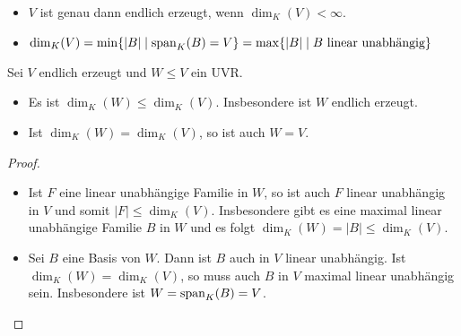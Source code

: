 \begin{remark}
	\begin{itemize}
		\item $V$ ist genau dann endlich erzeugt, wenn $\dim_K(V)< \infty$.
		\item $\dim_K(V)=\min\{|B| \mid \operatorname{span}_K(B)=V\}=\max\{|B| \mid B\text{ linear unabhängig}\}$
	\end{itemize}
\end{remark}

\begin{proposition}
	Sei $V$ endlich erzeugt und $W\le V$ ein UVR.
	\begin{itemize}
		\item Es ist $\dim_K(W)\le \dim_K(V)$. Insbesondere ist $W$ endlich erzeugt.
		\item Ist $\dim_K(W)=\dim_K(V)$, so ist auch $W=V$.
	\end{itemize}
\end{proposition}
\begin{proof}
	\begin{itemize}
		\item Ist $F$ eine linear unabhängige Familie in $W$, so ist auch $F$ linear unabhängig in $V$ und somit $|F|\le 
		\dim_K(V)$. Insbesondere gibt es eine maximal linear unabhängige Familie $B$ in $W$ und es folgt $\dim_K(W)=|B|
		\le \dim_K(V)$.
		\item Sei $B$ eine Basis von $W$. Dann ist $B$ auch in $V$ linear unabhängig. Ist $\dim_K(W)=\dim_K(V)$, so muss 
		auch $B$ in $V$ maximal linear unabhängig sein. Insbesondere ist $W=\operatorname{span}_K(B)=V$.
	\end{itemize}
\end{proof}